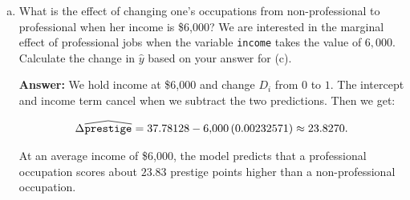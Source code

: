 \documentclass[12pt,letterpaper]{article}
\newcommand{\rcode}[2]{}
\newcommand{\answer}{\par\vspace{.18cm}\noindent\textbf{Answer:} }
\renewcommand{\widehat}[1]{\mathord{\tikz[baseline=(outcome.base)]{
  \node[inner sep=0pt,outer sep=0pt] (outcome) {$#1$};
  \draw[line width=.48pt,line join=round]
    ([yshift=1.1pt]outcome.north west) -- ([yshift=4pt]outcome.north) --
    ([yshift=1.1pt]outcome.north east);}}}
\begin{document}
\begin{enumerate}[(a)]
\answer The income and interaction coefficients add up to $0.00084520$ prestige points per dollar. For a \$1,000 increase in income, the predicted change is:

$$\Delta\widehat{\texttt{prestige}}=1{,}000\,(0.00317091-0.00232571)\approx 0.8452.$$

\rcode{50}{51}
\begin{verbatim}
[1] 0.8452
\end{verbatim}

On average, a \$1,000 increase in occupational income is associated with about $0.85$ more prestige points for professional occupations ($D_i=1$).

\item What is the effect of changing one's occupations from non-professional to professional when her income is \$6,000? We are interested in the marginal effect of professional jobs when the variable \texttt{income} takes the value of $6,000$. Calculate the change in $\hat{y}$ based on your answer for (c).

\answer We hold income at \$6,000 and change $D_i$ from $0$ to $1$. The intercept and income term cancel when we subtract the two predictions. Then we get:

$$\Delta\widehat{\texttt{prestige}}=37.78128-6{,}000\,(0.00232571)\approx 23.8270.$$

\rcode{56}{60}

\par\nobreak
{\setlength{\tabcolsep}{4pt}\renewcommand{\arraystretch}{0.93}%
\noindent{}\par}
\smallskip

At an average income of \$6,000, the model predicts that a professional occupation scores about $23.83$ prestige points higher than a non-professional occupation.
\end{enumerate}

\newpage

\end{document}
